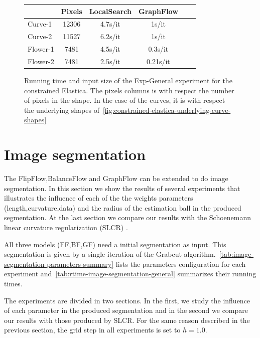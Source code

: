 \begin{figure}
\center
\captionsetup{type=table}
\begin{tabular}{|l|c|c|c|c|c|}
\hline
& Pixels & LocalSearch & GraphFlow \\
\hline
Curve-1 & 12306 & 4.7s/it & 1s/it\\
Curve-2 & 11527 & 6.2s/it & 1s/it\\
Flower-1  & 7481 & 4.5s/it & 0.3s/it \\
Flower-2 & 7481 & 2.5s/it & 0.21s/it\\
\hline
\end{tabular}
\caption{Running time and input size of the Exp-General experiment for the constrained Elastica. The pixels columns is with respect the number of pixels in the shape. In the case of the curves, it is with respect the underlying shapes of~\cref{fig:constrained-elastica-underlying-curve-shapes}}
\label{tab:rtime-constrained-elastica-general} 
\end{figure}


\section{Image segmentation}

The FlipFlow,BalanceFlow and GraphFlow can be extended to do image segmentation. In this section we show the results of several experiments that illustrates the influence of each of the the weights parameters (length,curvature,data) and the radius of the estimation ball in the produced segmentation. At the last section we compare our results with the Schoenemann linear curvature regularization (SLCR) \cite{schoenemann09linear}. 

All three models (FF,BF,GF) need a initial segmentation as input. This segmentation is given by a single iteration of the Grabcut algorithm.~\cref{tab:image-segmentation-parameters-summary} lists the parameters configuration for each experiment and~\cref{tab:rtime-image-segmentation-general} summarizes their running times. 

The experiments are divided in two sections. In the first, we study the influence of each parameter in the produced segmentation and in the second we compare our results with those produced by SLCR. For the same reason described in the previous section, the grid step in all experiments is set to $h=1.0$.


